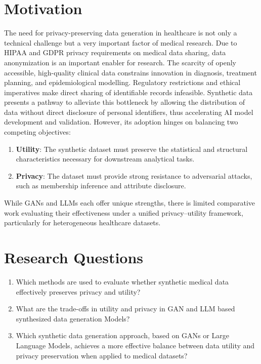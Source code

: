 \documentclass[master,proposal,extern,palatino]{rgseThesis}
\begin{document}
\section{Motivation}
The need for privacy-preserving data generation in healthcare is not only a technical challenge but a very important factor of medical research. Due to HIPAA and GDPR privacy requirements on medical data sharing, data anonymization is an important enabler for research. The scarcity of openly accessible, high-quality clinical data constrains innovation in diagnosis, treatment planning, and epidemiological modelling. Regulatory restrictions and ethical imperatives make direct sharing of identifiable records infeasible. 
Synthetic data presents a pathway to alleviate this bottleneck by allowing the distribution of data without direct disclosure of personal identifiers, thus accelerating AI model development and validation. However, its adoption hinges on balancing two competing objectives:
\begin{enumerate}
    \item \textbf{Utility}: The synthetic dataset must preserve the statistical and structural characteristics necessary for downstream analytical tasks.
    \item \textbf{Privacy}: The dataset must provide strong resistance to adversarial attacks, such as membership inference and attribute disclosure.
\end{enumerate}
While GANs and LLMs each offer unique strengths, there is limited comparative work evaluating their effectiveness under a unified privacy–utility framework, particularly for heterogeneous healthcare datasets.

\section{Research Questions}
\begin{enumerate}
    \item Which methods are used to evaluate whether synthetic medical data effectively preserves privacy and utility?
    \item What are the trade-offs in utility and privacy in GAN and LLM based synthesized data generation Models?
    \item Which synthetic data generation approach, based on GANs or Large Language Models, achieves a more effective balance between data utility and privacy preservation when applied to medical datasets?
    
\end{enumerate}
\end{document}
